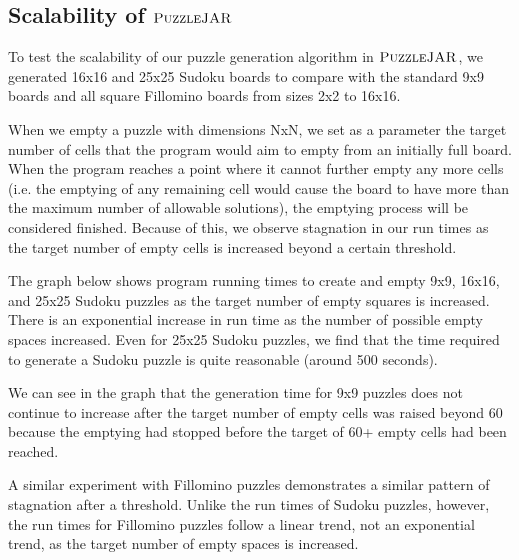 \subsection{Scalability of $\textsc{PuzzleJAR}$}

To test the scalability of our puzzle generation algorithm in
$\textsc{PuzzleJAR}$, we generated 16x16 and 25x25 Sudoku boards to compare
with the standard 9x9 boards and all square Fillomino boards from
sizes 2x2 to 16x16.

When we empty a puzzle with dimensions NxN, we set as a parameter the
target number of cells that the program would aim to empty from an
initially full board. When the program reaches a point where it cannot
further empty any more cells (i.e. the emptying of any remaining cell
would cause the board to have more than the maximum number of
allowable solutions), the emptying process will be considered
finished. Because of this, we observe stagnation in our run times as
the target number of empty cells is increased beyond a certain
threshold.

The graph below shows program running times to create and empty 9x9, 16x16, and 25x25 Sudoku puzzles as the target number of empty squares is increased. There is an exponential increase in run time as the number of possible empty spaces increased. Even for 25x25 Sudoku puzzles, we find that the time required to generate a Sudoku puzzle is quite reasonable (around 500 seconds).

We can see in the graph that the generation time for 9x9 puzzles does not continue to increase after the target number of empty cells was raised beyond 60 because the emptying had stopped before the target of 60+ empty cells had been reached. 

A similar experiment with Fillomino puzzles demonstrates a similar pattern of stagnation after a threshold. Unlike the run times of Sudoku puzzles, however, the run times for Fillomino puzzles follow a linear trend, not an exponential trend, as the target number of empty spaces is increased.

